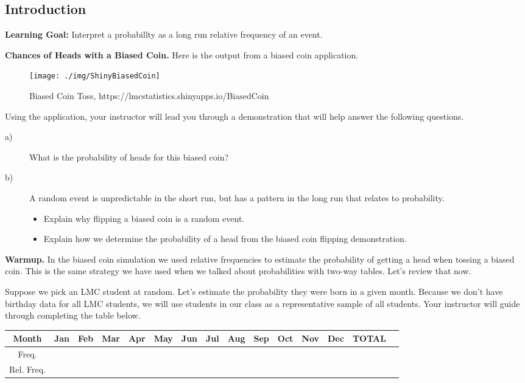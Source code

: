 \subsection{Introduction}
\textbf{Learning Goal:} Interpret a probabillty as a long run relative frequency of an event.

\textbf{Chances of Heads with a Biased Coin.} Here is the output from a biased coin application.  
\begin{figure}[H]
\centering{}\texttt{[image: ./img/ShinyBiasedCoin]} \caption{Biased Coin Toss, https://lmcstatistics.shinyapps.io/BiasedCoin}
\label{fig:normSDs}
\end{figure}

Using the application, your instructor will lead you through a demonstration that will help answer the following questions.

\begin{description}
\item[a)] What is the probability of heads for this biased coin?
\item[b)] A random event is unpredictable in the short run, but has a pattern in the long run that relates to probability.
\begin{itemize}
\item Explain why flipping a biased coin is a random event.\\[.5in]
\item Explain how we determine the probability of a head from the biased coin flipping demonstration.\\[.5in]
\end{itemize}
\end{description}

\textbf{Warmup.} In the biased coin simulation we used relative frequencies to estimate the probability of getting a head when tossing a biased coin. This is the same strategy we have used when we talked about probabilities with two-way tables. Let's review that now.

Suppose we pick an LMC student at random. Let's estimate the probability they were born in a given month. Because we don't have birthday data for all LMC students, we will use students in our class as a representative sample of all students. Your instructor will guide through completing the table below.

\begin{table}[h]\centering
\begin{tabular}{|c|c|c|c|c|c|c|c|c|c|c|c|c|c|c|}\hline
Month&Jan&Feb&Mar&Apr&May&Jun&Jul&Aug&Sep&Oct&Nov&Dec&TOTAL\\
\hline
Freq.&&&&&&&&&&&&&\\
\hline
Rel. Freq.&&&&&&&&&&&&&\\
\hline
\end{tabular}
\end{table}

